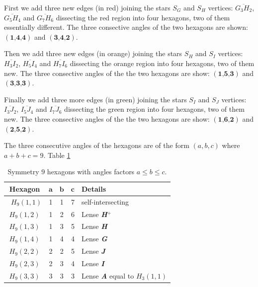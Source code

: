 \documentclass[11pt]{article}
\begin{document}
First we add three new edges (in red) joining the stars $S_G$ and $S_H$ vertices: $\overline{G_3H_2}$, $\overline{G_5H_4}$ and $\overline{G_7H_6}$ dissecting the red region into four hexagons, two of them essentially different. The three consective angles of the two hexagons are shown: $(\textbf{1,4,4})$ and $(\textbf{3,4,2})$.

Then we add three new edges (in orange) joining the stars $S_H$ and $S_I$ vertices: $\overline{H_3I_2}$, $\overline{H_5I_4}$ and $\overline{H_7I_6}$ dissecting the orange region into four hexagons, two of them new. The three consective angles of the the two hexagons are show: $(\textbf{1,5,3})$ and $(\textbf{3,3,3})$.

Finally we add three more edges (in green) joining the stars $S_I$ and $S_J$ vertices:
$\overline{I_3J_2}$, $\overline{I_5J_4}$ and $\overline{I_7J_6}$ dissecting the green region into four hexagons, two of them new. The three consective angles of the the two hexagons are show: $(\textbf{1,6,2})$ and $(\textbf{2,5,2})$.

The three consecutive angles of the hexagons are of the form $(a,b,c)$ where $a+b+c = 9$. Table \ref{tbl:hexagons-angles}

\begin{table}[H]
\begin{center}
\begin{tabular}{| c | c c c | l | }
\hline
Hexagon & $\textbf{a}$ & $\textbf{b}$ & $\textbf{c}$ & Details \\ \hline\
$H_9(1,1)$ & 1 & 1 & 7 & self-intersecting \\[1.1ex] \hline
$H_9(1,2)$ & 1 & 2 & 6 & Lense \textbf{\em H$^+$}\\[1.1ex] \hline
$H_9(1,3)$ & 1 & 3 & 5 & Lense \textbf{\em H} \\[1.1ex] \hline
$H_9(1,4)$ & 1 & 4 & 4 & Lense \textbf{\em G} \\[1.1ex] \hline
$H_9(2,2)$ & 2 & 2 & 5 & Lense \textbf{\em J} \\[1.1ex] \hline
$H_9(2,3)$ & 2 & 3 & 4 & Lense \textbf{\em I} \\[1.1ex] \hline
$H_9(3,3)$ & 3 & 3 & 3 & Lense \textbf{\em A} equal to $H_3(1,1)$ \\[1.1ex] \hline
\end{tabular}
\caption{Symmetry $9$ hexagons with angles factors $a \leq b \leq c$.} 
\label{tbl:hexagons-angles}
\end{center}
\end{table}
\end{document}
